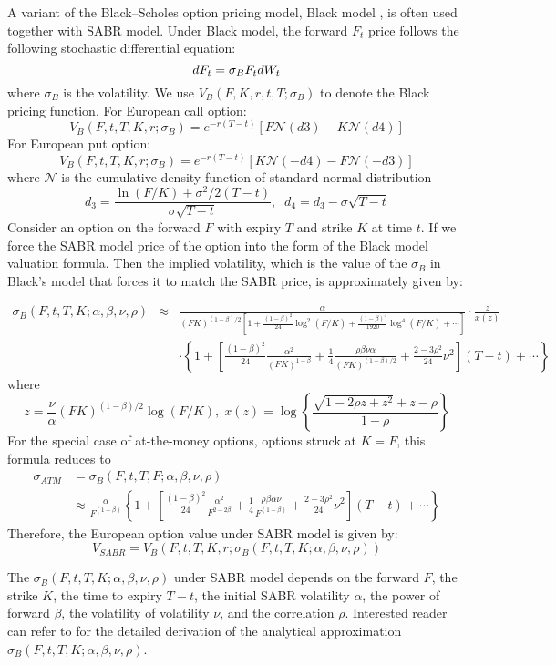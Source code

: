 \documentclass[letterpaper,12pt,titlepage,oneside,final]{book}
\numberwithin{equation}{section}
\theoremstyle{definition}
\begin{document}
A variant of the Black–Scholes option pricing model, Black model \cite{black1976pricing}, is often used together with SABR model. Under Black model, the  forward $F_t$ price follows the following stochastic differential equation:
\[
dF_t=\sigma_B F_t dW_t\\
\]
where $\sigma_B$ is the volatility. We use $V_B(F,K,r,t,T;\sigma_{B})$ to denote the Black pricing function. For European call option:
\[
V_B(F,t,T,K,r;\sigma_{B})=e^{-r(T-t)}[F \mathcal{N} (d3)-K  \mathcal{N} (d4)]
\]
For European put option:
\[
V_B(F,t,T,K,r;\sigma_{B})=e^{-r(T-t)}[K  \mathcal{N} (-d4)-F  \mathcal{N} (-d3)]
\]
where $\mathcal{N}$ is the cumulative density function of standard normal distribution
\[
d_3=\frac{\ln(F/K)+\sigma^2/2(T-t)}{\sigma \sqrt{T-t}}, \;\; d_4=d_3-\sigma  \sqrt{T-t}
\]
Consider an option on the forward $F$ with expiry $T$ and strike $K$ at time $t$.
If we force the SABR model price of the option into the form of the Black model valuation formula. Then the implied volatility, which is the value of the $\sigma_B$ in Black's model that forces it to match the SABR price, is approximately given by:

\begin{eqnarray*}
	\sigma_{B}(F,t,T,K;\alpha,\beta,\nu,\rho) &\approx&
	\frac{\alpha}{(FK)^{(1-\beta)/2}\left[1+\frac{(1-\beta)^2}{24}\log^2(F/K)
		+ \frac{(1-\beta)^4}{1920}\log^4(F/K) + \cdots\right]} \cdot
	\frac{z}{x(z)}  \\
	& & \cdot \left\{1+\left[\frac{(1-\beta)^2}{24}\frac{\alpha^2}{(FK)^{1-\beta}}
	+ \frac{1}{4} \frac{\rho\beta\nu\alpha}{(FK)^{(1-\beta)/2}} +
	\frac{2-3\rho^2}{24}\nu^2 \right](T-t)+\cdots\right\}
\end{eqnarray*}
where
\[
z = \frac{\nu}{\alpha}(FK)^{(1-\beta)/2}\log (F/K),\; x(z) =
\log\left\{\frac{\sqrt{1-2\rho z + z^2}+z-\rho}{1-\rho}\right\}
\]
For the special case of at-the-money options, options struck at $K=F$,
this formula reduces to
\[
\begin{split}
\sigma_{ATM} &= \sigma_{B}(F,t,T,F;\alpha,\beta,\nu,\rho) \\
&\approx
\frac{\alpha}{F^{(1-\beta)}}\left\{1 +
\left[\frac{(1-\beta)^2}{24}\frac{\alpha^2}{F^{2-2\beta}} +
\frac{1}{4}\frac{\rho\beta\alpha\nu}{F^{(1-\beta)}} +
\frac{2-3\rho^2}{24}\nu^2 \right] (T-t) + \cdots \right\}
\end{split}
\]
Therefore, the European option value under SABR model is given by:
\[
V_{SABR}=V_B(F,t,T,K,r;\sigma_{B}(F,t,T,K;\alpha,\beta,\nu,\rho))
\]

The $\sigma_{B}(F,t,T,K;\alpha,\beta,\nu,\rho)$ under SABR model depends on the forward $F$, the strike $K$, the time to expiry $T-t$, the initial SABR volatility $\alpha$, the power of forward $\beta$, the volatility of volatility $\nu$, and the correlation $\rho$.  Interested reader can refer to \cite{hagan2002managing} for the detailed derivation of the analytical approximation $\sigma_{B}(F,t,T,K;\alpha,\beta,\nu,\rho)$. 
\end{document}
